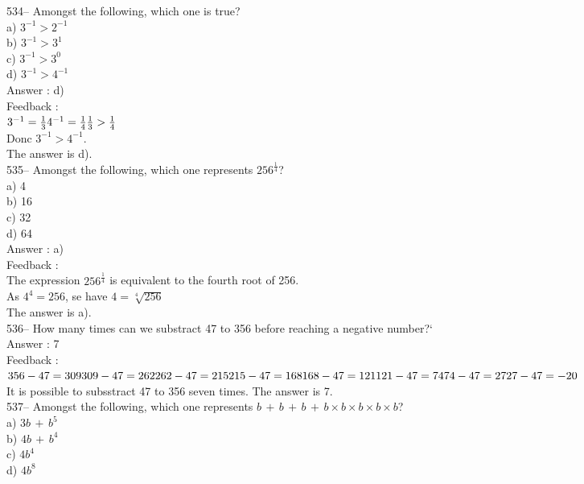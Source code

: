 \documentclass[letterpaper, 12pt]{article}
\begin{document}
534-- Amongst the following, which one is true?\\
a) $3^{-1}>2^{-1}$\\
b) $3^{-1}>3^{1}$\\
c) $3^{-1}>3^{0}$\\
d) $3^{-1}>4^{-1}$\\

Answer : d)\\

Feedback : \\
$3^{-1}=\frac{1}{3}\\[2mm]
4^{-1}=\frac{1}{4}\\[2mm]
\frac{1}{3}>\frac{1}{4}$\\[2mm]
Donc $3^{-1}>4^{-1}$.\\[2mm]
The answer is d).\\

535-- Amongst the following, which one represents
$256^{\frac{1}{4}}$?\\
a) 4\\
b) 16\\
c) 32\\
d) 64\\

Answer : a)\\

Feedback : \\
The expression $256^{\frac{1}{4}}$ is equivalent to the fourth root of 256.  \\
As $4^{4} = 256$, se have $4=\sqrt[4]{256}$ \\
The answer is a).\\

536-- How many times can we substract 47 to 356 before reaching a negative number?`\\

Answer : 7\\

Feedback : \\
$356-47=309\\
309-47=262\\
262-47=215\\
215-47=168\\
168-47=121\\
121-47=74\\
74-47=27\\
27-47=-20$\\
It is possible to subsstract 47 to 356 seven times.  The answer is 7.\\


537-- Amongst the following, which one represents
$b\,+\,b\,+\,b\,+\,b\times b\times b \times b \times b$?\\
a) $3b\,+\,b^{5}$\\
b) $4b\,+\,b^{4}$\\
c) $4b^{4}$\\
d) $4b^{8}$\\
\end{document}
